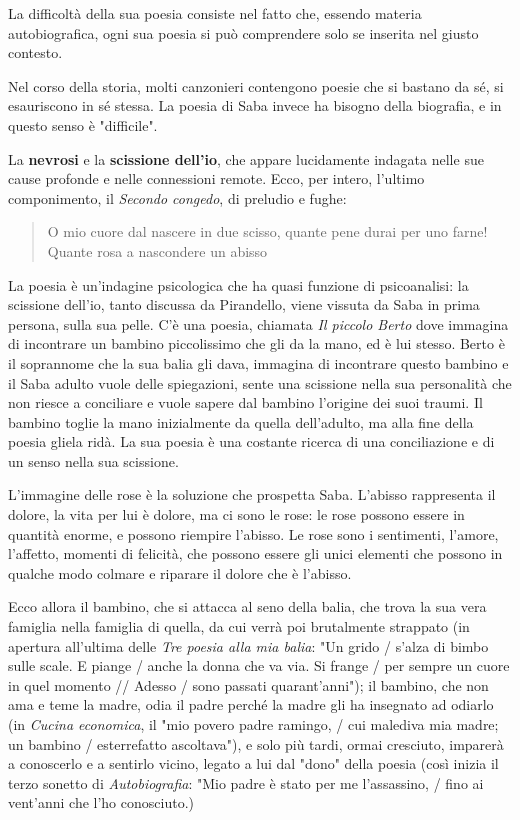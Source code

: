 \documentclass[a4paper, twoside, titlepage]{book}
\newcounter{mar}
\newcommand{\citazione}[1]{%
  \begin{quotation}
  \begin{linenumbers}
  \modulolinenumbers[5]
  \begingroup
  \setlength{\parindent}{0cm}
  \noindent #1
  \endgroup
  \end{linenumbers}
  \end{quotation}\setcounter{linenumber}{1}
  }
\begin{document}
La difficoltà della sua poesia consiste nel fatto che, essendo materia autobiografica, ogni sua poesia si può comprendere solo se inserita nel giusto contesto.

Nel corso della storia, molti canzonieri contengono poesie che si bastano da sé, si esauriscono in sé stessa. La poesia di Saba invece ha bisogno della biografia, e in questo senso è "difficile".

La \textbf{nevrosi} e la \textbf{scissione dell'io}, che appare lucidamente indagata nelle sue cause profonde e nelle connessioni remote. Ecco, per intero, l'ultimo componimento, il \textit{Secondo congedo}, di preludio e fughe:
\citazione{O mio cuore dal nascere in due scisso,
quante pene durai per uno farne!
Quante rosa a nascondere un abisso}

La poesia è un'indagine psicologica che ha quasi funzione di psicoanalisi: la scissione dell'io, tanto discussa da Pirandello, viene vissuta da Saba in prima persona, sulla sua pelle. C’è una poesia, chiamata \textit{Il piccolo Berto} dove immagina di incontrare un bambino piccolissimo che gli da la mano, ed è lui stesso. Berto è il soprannome che la sua balia gli dava, immagina di incontrare questo bambino e il Saba adulto vuole delle spiegazioni, sente una scissione nella sua personalità che non riesce a conciliare e vuole sapere dal bambino l’origine dei suoi traumi. Il bambino toglie la mano inizialmente da quella dell’adulto, ma alla fine della poesia gliela ridà. La sua poesia è una costante ricerca di una conciliazione e di un senso nella sua scissione.

L'immagine delle rose è la soluzione che prospetta Saba. L'abisso rappresenta il dolore, la vita per lui è dolore, ma ci sono le rose: le rose possono essere in quantità enorme, e possono riempire l'abisso.
Le rose sono i sentimenti, l'amore, l'affetto, momenti di felicità, che possono essere gli unici elementi che possono in qualche modo colmare e riparare il dolore che è l'abisso.

Ecco allora il bambino, che si attacca al seno della balia, che trova la sua vera famiglia nella famiglia di quella, da cui verrà poi brutalmente strappato (in apertura all'ultima delle \textit{Tre poesia alla mia balia}: "Un grido / s'alza di bimbo sulle scale. E piange / anche la donna che va via. Si frange / per sempre un cuore in quel momento // Adesso / sono passati quarant'anni"); il bambino, che non ama e teme la madre, odia il padre perché la madre gli ha insegnato ad odiarlo (in \textit{Cucina economica}, il "mio povero padre ramingo, / cui malediva mia madre; un bambino / esterrefatto ascoltava"), e solo più tardi, ormai cresciuto, imparerà a conoscerlo e a sentirlo vicino, legato a lui dal "dono" della poesia (così inizia il terzo sonetto di \textit{Autobiografia}: "Mio padre è stato per me l'assassino, / fino ai vent'anni che l'ho conosciuto.)
\end{document}
